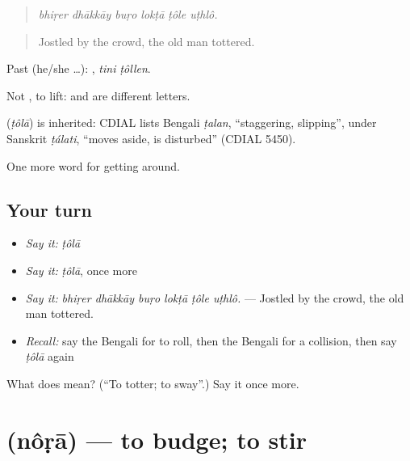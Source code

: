 \begin{quote}
     
\end{quote}

\begin{quote}
\emph{bhiṛer dhākkāy buṛo lokṭā ṭôle uṭhlô.}
\end{quote}

\begin{quote}
Jostled by the crowd, the old man tottered.
\end{quote}

Past (he/she …):  , \emph{tini ṭôllen}.

Not , to lift:  and  are different letters.

\begin{cousinweb}
\textbf{} (\emph{ṭôlā}) is inherited: CDIAL lists Bengali \emph{ṭalan}, \textquotedblleft{}staggering, slipping\textquotedblright{}, under Sanskrit \emph{ṭálati}, \textquotedblleft{}moves aside, is disturbed\textquotedblright{} (CDIAL 5450).
\end{cousinweb}

\begin{grammarlens}[title={What you've built}]
One more word for getting around.
\end{grammarlens}

\subsection*{Your turn}
\begin{itemize}
\raggedright
  \item \emph{Say it:} \emph{ṭôlā}
  \item \emph{Say it:} \emph{ṭôlā}, once more
  \item \emph{Say it:} \emph{bhiṛer dhākkāy buṛo lokṭā ṭôle uṭhlô.} — Jostled by the crowd, the old man tottered.
  \item \emph{Recall:} say the Bengali for to roll, then the Bengali for a collision, then say \emph{ṭôlā} again
\end{itemize}

\begin{tcolorbox}[breakable,colback=teal!4,colframe=teal!35!black,title={Before you move on}]
What does  mean? (\textquotedblleft{}To totter; to sway\textquotedblright{}.) Say it once more.
\end{tcolorbox}
\section[\texorpdfstring{\bn{নড়া} (nôṛā)}{নড়া (nôṛā)}]{ (nôṛā) — to budge; to stir}

